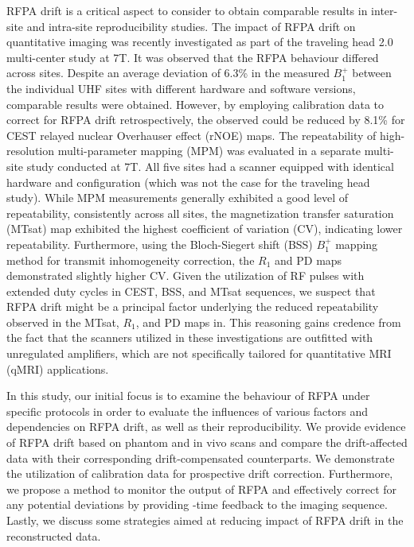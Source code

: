 RFPA drift is a critical aspect to consider to obtain comparable results in inter-site and intra-site reproducibility studies. The impact of RFPA drift on quantitative imaging was recently investigated as part of the traveling head 2.0 multi-center study at 7T. \cite{VOELKER2021117910} It was observed that the RFPA behaviour differed across sites. Despite an average deviation of 6.3\% in the measured $B_1^+$ between the individual UHF sites with different hardware and software versions, comparable results were obtained. However, by employing calibration data to correct for RFPA drift retrospectively, the observed  could be reduced by 8.1\% for CEST relayed nuclear Overhauser effect (rNOE) maps. The repeatability of high-resolution multi-parameter mapping (MPM) was evaluated in a separate multi-site study conducted at 7T.\cite{sherif2022repeatability} All five sites had a scanner equipped with identical hardware and configuration (which was not the case for the traveling head study). While MPM measurements generally exhibited a good level of repeatability, consistently across all sites, the magnetization transfer saturation (MTsat) map exhibited the highest coefficient of variation (CV), indicating lower repeatability. Furthermore, using the Bloch-Siegert shift (BSS)\cite{Sacolick2010} $B_1^+$ mapping method for transmit inhomogeneity correction, the $R_1$ and PD maps demonstrated slightly higher CV. Given the utilization of RF pulses with extended duty cycles in CEST, BSS, and MTsat sequences, we suspect that RFPA drift might be a principal factor underlying the reduced repeatability observed in the MTsat, $R_1$, and PD maps in\cite{sherif2022repeatability}. This reasoning gains credence from the fact that the scanners utilized in these investigations are outfitted with unregulated amplifiers, which are not specifically tailored for quantitative MRI (qMRI) applications.

In this study, our initial focus is to examine the behaviour of RFPA under specific protocols in order to evaluate the influences of various factors and dependencies on RFPA drift, as well as their reproducibility. We provide evidence of RFPA drift based on phantom and in vivo scans and compare the drift-affected data with their corresponding drift-compensated counterparts. We demonstrate the utilization of calibration data for prospective drift correction. Furthermore, we propose a method to monitor the output of RFPA and effectively correct for any potential deviations by providing -time feedback to the imaging sequence. Lastly, we discuss some strategies aimed at reducing impact of RFPA drift in the reconstructed data.


